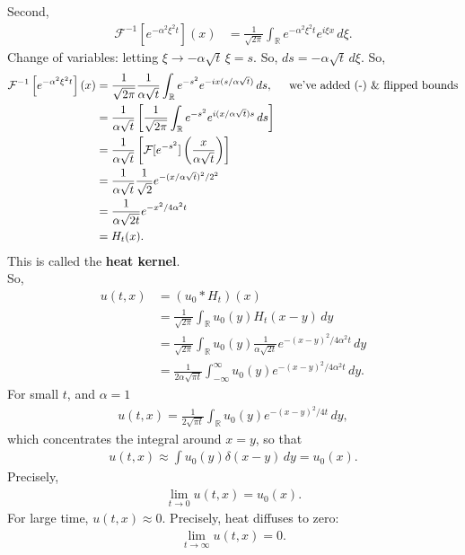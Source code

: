 \documentclass{article}
\theoremstyle{definition}
\newcommand{\R}{\mathbb{R}}
\newcommand{\F}{\mathcal{F}}
\newcommand{\al}{\alpha}
\newcommand{\f}[2]{\frac{#1}{#2}}
\newcommand{\ift}{\infty}
\newcommand{\lp}{\left(}
\newcommand{\rp}{\right)}
\newcommand{\lb}{\left[}
\newcommand{\rb}{\right]}
\begin{document}
Second,
\begin{align*}
\F^{-1}\lb e^{-\al^2\xi^2 t} \rb(x) &= \f{1}{\sqrt{2\pi}}\int_\R e^{-\al^2\xi^2 t}e^{i\xi x}\,d\xi.
\end{align*}
Change of variables: letting $\xi \to -\al\sqrt{t}\,\xi = s$. So, $ds = -\al \sqrt{t}\,d\xi$. So,
\begin{align*}
\F^{-1}\lb e^{-\al^2\xi^2 t} \rb(x) 
&= \f{1}{\sqrt{2\pi}} \f{1}{\al\sqrt{t}}\int_{\R}e^{-s^2}e^{-ix(s/\al\sqrt{t})}\,ds, \hspace{0.5cm}\text{we've added (-) \& flipped bounds}\\
&= \f{1}{\al\sqrt{t}}\lb \f{1}{\sqrt{2\pi}} \int_{\R}e^{-s^2}e^{i(x/\al\sqrt{t})s}\,ds \rb\\
&= \f{1}{\al\sqrt{t}}\lb \F[e^{-s^2}]\lp \f{x}{\al \sqrt{t}} \rp  \rb\\
&= \f{1}{\al\sqrt{t}}\f{1}{\sqrt{2}} e^{-(x/\al\sqrt{t})^2/2^2}\\
&= \frac{1}{\al \sqrt{2t}}e^{-x^2/4\al^2 t}\\
&= H_t(x).
\end{align*} 
This is called the \textbf{heat kernel}. \\

So,
\begin{align*}
u(t,x) &= (u_0 \ast H_t)(x)\\
&= \f{1}{\sqrt{2\pi}} \int_\R u_0(y)H_t(x-y)\,dy\\
&= \f{1}{\sqrt{2\pi}} \int_\R u_0(y)\frac{1}{\al \sqrt{2t}}e^{-(x-y)^2/4\al^2 t}\,dy\\
&= \f{1}{2\al\sqrt{\pi t}} \int^\ift_{-\ift} u_0(y)e^{-(x-y)^2/4\al^2 t}\,dy.
\end{align*}
For small $t$, and $\al = 1$
\begin{align*}
u(t,x) = \f{1}{2\sqrt{\pi t}}\int_\R u_0(y)e^{-(x-y)^2/4t}\,dy,
\end{align*}
which concentrates the integral around $x=y$, so that
\begin{align*}
u(t,x) \approx \int u_0(y)\delta(x-y)\,dy = u_0(x).
\end{align*}
Precisely, 
\begin{align*}
\lim_{t\to 0}u(t,x) = u_0(x).
\end{align*}
For large time, $u(t,x) \approx 0$. Precisely, heat diffuses to zero:
\begin{align*}
\lim_{t\to \ift}u(t,x) = 0.
\end{align*}


\end{document}
